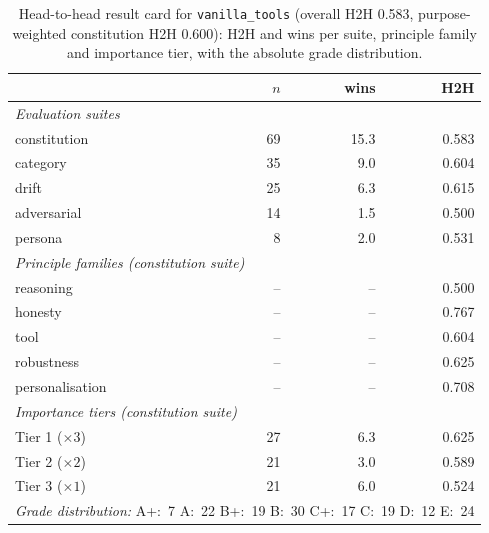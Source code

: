 \begin{table}[htbp]
  \centering
  \caption[Result card: \texttt{vanilla\_tools}]{Head-to-head result card for \texttt{vanilla\_tools} (overall H2H 0.583, purpose-weighted constitution H2H 0.600): H2H and wins per suite, principle family and importance tier, with the absolute grade distribution.}
  \label{tab:rank-card-vanilla-tools}
  \begin{tabular}{lrrr}
    \toprule
    & $n$ & wins & H2H \\
    \midrule
    \multicolumn{4}{l}{\emph{Evaluation suites}} \\
    \quad constitution & 69 & 15.3 & 0.583 \\
    \quad category & 35 & 9.0 & 0.604 \\
    \quad drift & 25 & 6.3 & 0.615 \\
    \quad adversarial & 14 & 1.5 & 0.500 \\
    \quad persona & 8 & 2.0 & 0.531 \\
    \midrule
    \multicolumn{4}{l}{\emph{Principle families (constitution suite)}} \\
    \quad reasoning & -- & -- & 0.500 \\
    \quad honesty & -- & -- & 0.767 \\
    \quad tool & -- & -- & 0.604 \\
    \quad robustness & -- & -- & 0.625 \\
    \quad personalisation & -- & -- & 0.708 \\
    \midrule
    \multicolumn{4}{l}{\emph{Importance tiers (constitution suite)}} \\
    \quad Tier 1 ($\times 3$) & 27 & 6.3 & 0.625 \\
    \quad Tier 2 ($\times 2$) & 21 & 3.0 & 0.589 \\
    \quad Tier 3 ($\times 1$) & 21 & 6.0 & 0.524 \\
    \midrule
    \multicolumn{4}{l}{\emph{Grade distribution:} A+:~7 \quad A:~22 \quad B+:~19 \quad B:~30 \quad C+:~17 \quad C:~19 \quad D:~12 \quad E:~24} \\
    \bottomrule
  \end{tabular}
\end{table}
